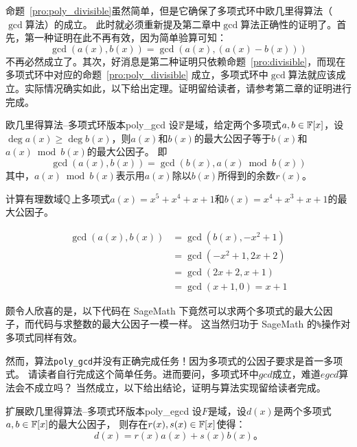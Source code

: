 命题~\ref{pro:poly_divisible}虽然简单，但是它确保了多项式环中欧几里得算法（$\gcd$算法）的成立。
此时就必须重新提及第二章中$\gcd$算法正确性的证明了。首先，第一种证明在此不再有效，因为简单验算可知：
\[\gcd(a(x), b(x)) = \gcd(a(x), (a(x) - b(x)))\]
不再必然成立了。其次，好消息是第二种证明只依赖命题~\ref{pro:divisible}，而现在多项式环中对应的命题~\ref{pro:poly_divisible}
成立，多项式环中$\gcd$算法就应该成立。实际情况确实如此，以下给出定理。证明留给读者，请参考第二章的证明进行完成。

\begin{theorem}{欧几里得算法--多项式环版本}{poly_gcd}
设${\mathbb F}$是域，给定两个多项式$a, b \in {\mathbb F}\lbrack x \rbrack$，设$\deg a(x) \geq \deg b(x)$，则$a(x)$和$b(x)$的最大公因子等于$b(x)$和$a(x) \bmod b(x)$的最大公因子。
即
\[\gcd(a(x), b(x)) = \gcd(b(x), a(x) \bmod b(x))\]
其中，$a(x) \bmod b(x)$表示用$a(x)$除以$b(x)$所得到的余数$r(x)$。
\end{theorem}

\begin{example}
\label{exm:gcd_poly_r}
计算有理数域${\mathbb Q}$上多项式$a(x) = x^5 + x^4 + x + 1$和$b(x) = x^4 + x^3 + x + 1$的最大公因子。

\begin{align*}
\gcd(a(x), b(x)) &= \gcd(b(x), -x^2 + 1)\\
                              &= \gcd(-x^2 + 1, 2x+2)\\
                              &= \gcd(2x + 2, x+1)\\
                              &= \gcd(x + 1, 0) = x+1
\end{align*}
\end{example}

颇令人欣喜的是，以下代码在 SageMath 下竟然可以求两个多项式的最大公因子，而代码与求整数的最大公因子一模一样。
这当然归功于 SageMath 的\lstinline|%|操作对多项式同样有效。

\begin{center}
	
\end{center}

然而，算法\lstinline|poly_gcd|并没有正确完成任务！因为多项式的公因子要求是首一多项式。
请读者自行完成这个简单任务。进而要问，多项式环中$gcd$成立，难道$egcd$算法会不成立吗？
当然成立，以下给出结论，证明与算法实现留给读者完成。

\begin{theorem}{扩展欧几里得算法--多项式环版本}{poly_egcd}
设$F$是域，设$d(x)$是两个多项式$a, b \in {\mathbb F}\lbrack x \rbrack$的最大公因子，
则存在$r(x), s(x) \in {\mathbb F}\lbrack x \rbrack$使得：
\[d(x) = r(x) a(x) + s(x)b(x)\text{。}\]
\end{theorem}


